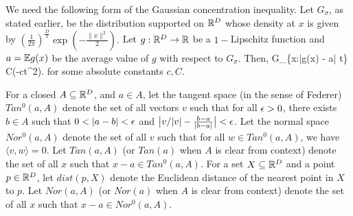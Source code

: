 \documentclass[final, 12pt]{colt2018} %
\begin{document}

We need the following form of the Gaussian concentration inequality. Let $G_\sigma$, as stated earlier, be the distribution supported on $\mathbb R^D$
whose density at $x$ is given by 
$ \left(\frac{1}{2 \pi }\right)^{\frac{D}{2}}  \exp \left(-\frac{\|x \|^2}{2} \right).$ Let $g:\mathbb R^D \rightarrow \mathbb R$ be a $1-$Lipschitz function and $a = \mathbb E g(x)$ be the average value of $g$ with respect to $G_\sigma$. Then,
\beq  G_\sigma\{x:|g(x) - a| \geq t\sigma\} \leq C\exp\left({-ct^2}\right).\eeq
 for some absolute constants $c, C$.

\begin{definition}

For a closed $A \subseteq \mathbb R^D$, and $a \in A$, let the tangent space (in the sense of Federer) $Tan^0(a, A)$ denote the set of all vectors $v$ such that for all ${\epsilon} > 0$, there exists $b \in A$ such that $0 < |a - b| < {\epsilon}$ and $\big|v/{|v|} - \frac{b-a}{|b-a|}\big| < {\epsilon}$.
 Let the normal space $Nor^0(a, A)$ denote the set of all $v$ such that for all $w \in Tan^0(a, A)$, we have $\langle v, w\rangle = 0$.
 Let $Tan(a, A)$ (or $Tan(a)$ when $A$ is clear from context) denote the set of all $x$ such that $ x -a \in Tan^0(a, A)$. For a set $X\subseteq \mathbb R^D$ and a point $p\in \mathbb R^D$,  let $dist(p, X)$ denote the Euclidean distance of the nearest point in $X$ to $p$. Let $Nor(a, A)$  (or $Nor(a)$ when $A$ is clear from context) denote the set of all $x$ such that $ x -a \in Nor^0(a, A)$.
\end{definition}
\end{document}
